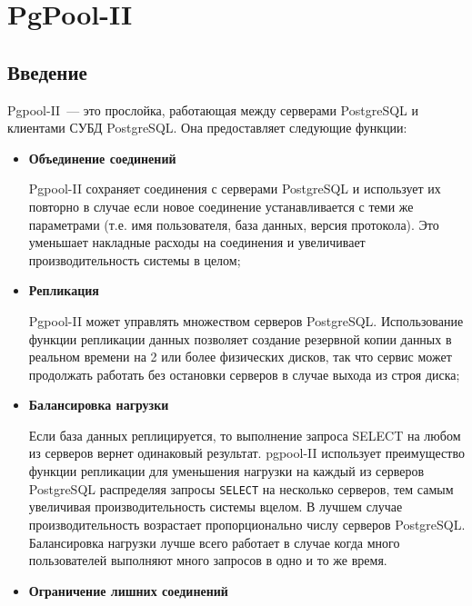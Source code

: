 \chapter{PgPool-II}

\begin{epigraphs}
\end{epigraphs}

\section{Введение}

Pgpool-II~--- это прослойка, работающая между серверами PostgreSQL и клиентами СУБД PostgreSQL. Она предоставляет следующие функции:

\begin{itemize}

\item \textbf{Объединение соединений}

Pgpool-II сохраняет соединения с серверами PostgreSQL и использует их повторно в случае если новое соединение устанавливается с теми же параметрами (т.е. имя пользователя, база данных, версия протокола). Это уменьшает накладные расходы на соединения и увеличивает производительность системы в целом;

\item \textbf{Репликация}

Pgpool-II может управлять множеством серверов PostgreSQL. Использование функции репликации данных позволяет создание резервной копии данных в реальном времени на  2 или более физических дисков, так что сервис может продолжать работать без остановки серверов в случае выхода из строя диска;

\item \textbf{Балансировка нагрузки}

Если база данных реплицируется, то выполнение запроса SELECT на любом из серверов вернет одинаковый результат. pgpool-II использует преимущество функции репликации для уменьшения нагрузки на каждый из серверов PostgreSQL распределяя запросы \lstinline!SELECT! на несколько серверов, тем самым увеличивая производительность системы вцелом. В лучшем случае производительность возрастает пропорционально числу серверов PostgreSQL. Балансировка нагрузки лучше всего работает в случае когда много пользователей выполняют много запросов в одно и то же время.

\item \textbf{Ограничение лишних соединений}


\end{itemize}
